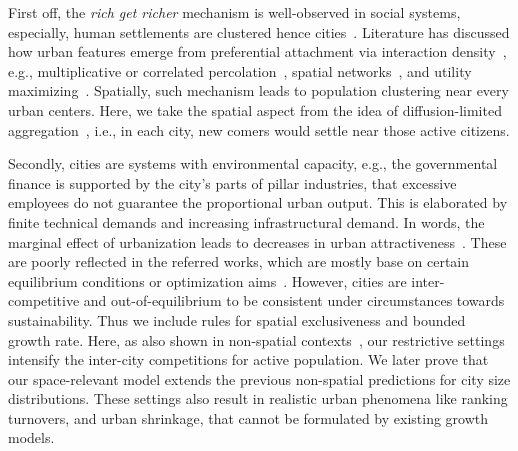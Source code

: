 \documentclass[reprint,unsortedaddress,amsmath,amssymb,aps,prl,showkeys]{revtex4-2}
\begin{document}
First off, the \textit{rich get richer} mechanism is well-observed in social systems, especially, human settlements are clustered hence cities~\cite{marsili1998interacting}. Literature has discussed how urban features emerge from preferential attachment via interaction density~\cite{ccolak2016understanding,louf2014congestion,fujita1976spatial}, e.g., multiplicative or correlated percolation~\cite{makse1995modelling,PhysRevE.58.7054,rybski2013distance}, spatial networks~\cite{marsili1998interacting,court2013origins,Li2017Simple}, and utility maximizing~\cite{PhysRevE.90.042815,axtell2001emergent}. Spatially, such mechanism leads to population clustering near every urban centers. Here, we take the spatial aspect from the idea of diffusion-limited aggregation~\cite{makse1995modelling, rybski2013distance, kleinberg2000navigation}, i.e., in each city, new comers would settle near those active citizens.

Secondly, cities are systems with environmental capacity, e.g., the governmental finance is supported by the city's parts of pillar industries, that excessive employees do not guarantee the proportional urban output. This is elaborated by finite technical demands and increasing infrastructural demand. In words, the marginal effect of urbanization leads to decreases in urban attractiveness~\cite{atkinson2012urban, girardin2009quantifying,gomez2018explaining,parris2003characterizing,batty2008size}. These are poorly reflected in the referred works, which are mostly base on certain equilibrium conditions or optimization aims~\cite{zipf1949human}. However, cities are inter-competitive and out-of-equilibrium to be consistent under circumstances towards sustainability\cite{fujita1976spatial,louf2014congestion,ccolak2016understanding}. Thus we include rules for spatial exclusiveness and bounded growth rate. Here, as also shown in non-spatial contexts~\cite{PhysRevE.55.R3817}, our restrictive settings intensify the inter-city competitions for active population\cite{batty2017urban}. We later prove that our space-relevant model extends the previous non-spatial predictions for city size distributions. These settings also result in realistic urban phenomena like ranking turnovers\cite{gabaix2004evolution}, and urban shrinkage\cite{haase2014conceptualizing}, that cannot be formulated by existing growth models.
\end{document}
